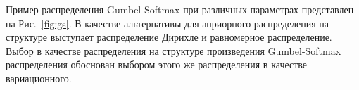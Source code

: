Пример распределения Gumbel-Softmax при различных параметрах представлен на Рис.~\ref{fig:gs}. В качестве альтернативы для априорного распределения на структуре выступает  распределение Дирихле и равномерное распределение. Выбор в качестве распределения на структуре произведения Gumbel-Softmax распределения обоснован выбором этого же распределения в качестве вариационного. 

\begin{figure}
 \begin{minipage}[t]{.2\textwidth}
        \centering
{}
\end{minipage}
\end{figure}
